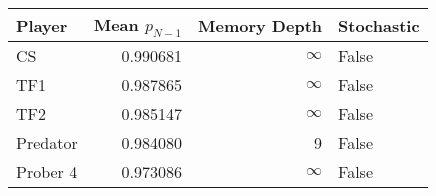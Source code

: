 \begin{tabular}{lrrl}
\toprule
   Player &  Mean $p_{N-1}$ &  Memory Depth & Stochastic \\
\midrule
       CS &        0.990681 &            \(\infty\) &      False \\
      TF1 &        0.987865 &            \(\infty\) &      False \\
      TF2 &        0.985147 &            \(\infty\) &      False \\
 Predator &        0.984080 &             9 &      False \\
 Prober 4 &        0.973086 &            \(\infty\) &      False \\
\bottomrule
\end{tabular}
